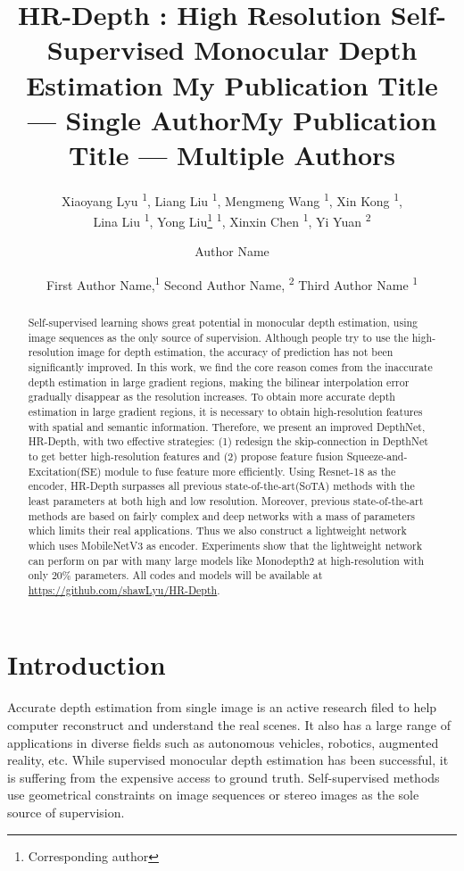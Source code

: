 \documentclass[letterpaper]{article} \usepackage{aaai21}  \usepackage{times}  \usepackage{helvet} \usepackage{courier}  \usepackage[hyphens]{url}  \usepackage{graphicx} \urlstyle{rm} \def\UrlFont{\rm}  \usepackage{natbib}  \usepackage{caption} \frenchspacing  \setlength{\pdfpagewidth}{8.5in}  \setlength{\pdfpageheight}{11in}  \usepackage{booktabs}
\title{ HR-Depth : High Resolution Self-Supervised Monocular Depth Estimation }
\author {
Xiaoyang Lyu \textsuperscript{\rm 1},
    Liang Liu \textsuperscript{\rm 1},
    Mengmeng Wang \textsuperscript{\rm 1},
    Xin Kong \textsuperscript{\rm 1}, \\
    Lina Liu \textsuperscript{\rm 1},
    Yong Liu\footnote{Corresponding author} \textsuperscript{\rm 1},
    Xinxin Chen \textsuperscript{\rm 1},
    Yi Yuan \textsuperscript{\rm 2} \\
}
\title{My Publication Title --- Single Author}
\author {
Author Name \\
}
\title{My Publication Title --- Multiple Authors}
\author {


        First Author Name,\textsuperscript{\rm 1}
        Second Author Name, \textsuperscript{\rm 2}
        Third Author Name \textsuperscript{\rm 1} \\
}
\begin{document}
\maketitle

\begin{abstract}
    Self-supervised learning shows great potential in monocular depth estimation, using image sequences as the only source of supervision. Although people
    try to use the high-resolution image for depth estimation, the accuracy of prediction has not been significantly improved. In this work, we find the core reason
    comes from the inaccurate depth estimation in large gradient regions, making the bilinear interpolation error gradually disappear as the resolution increases.
    To obtain more accurate depth estimation in large gradient regions, it is necessary to obtain high-resolution features with spatial and semantic information. 
    Therefore, we present an improved DepthNet, HR-Depth, with two effective strategies: (1) redesign the skip-connection in DepthNet to get better high-resolution
    features and (2) propose feature fusion Squeeze-and-Excitation(fSE) module to fuse feature more efficiently. Using Resnet-18 as the encoder, HR-Depth surpasses 
    all previous state-of-the-art(SoTA) methods with the least parameters at both high and low resolution. Moreover, previous state-of-the-art methods are based on fairly
    complex and deep networks with a mass of parameters which limits their real applications. Thus we also construct a lightweight network which uses MobileNetV3 as
    encoder. Experiments show that the lightweight network can perform on par with many large models like Monodepth2 at high-resolution with only $20\%$ parameters.
    All codes and models will be available at \url{https://github.com/shawLyu/HR-Depth}.
\end{abstract}
\section{Introduction}
Accurate depth estimation from single image is an active research filed to help computer reconstruct and understand the real scenes. It also has a large range of 
applications in diverse fields such as autonomous vehicles, robotics, augmented reality, etc. While supervised monocular depth estimation has been successful, it is 
suffering from the expensive access to ground truth. Self-supervised methods use geometrical constraints on image sequences or stereo images as the sole source of 
supervision. 
\end{document}

